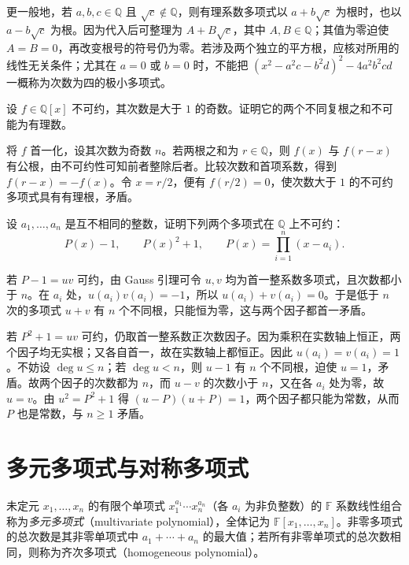 更一般地，若 $a,b,c\in\mathbb Q$ 且 $\sqrt c\notin\mathbb Q$，则有理系数多项式以 $a+b\sqrt c$ 为根时，也以 $a-b\sqrt c$ 为根。因为代入后可整理为 $A+B\sqrt c$，其中 $A,B\in\mathbb Q$；其值为零迫使 $A=B=0$，再改变根号的符号仍为零。若涉及两个独立的平方根，应核对所用的线性无关条件；尤其在 $a=0$ 或 $b=0$ 时，不能把 $(x^2-a^2c-b^2d)^2-4a^2b^2cd$ 一概称为次数为四的极小多项式。

\begin{example}
\label{ex:poly-odd-degree-root-sum}
设 $f\in\mathbb Q[x]$ 不可约，其次数是大于 $1$ 的奇数。证明它的两个不同复根之和不可能为有理数。
\end{example}
\begin{solve}
将 $f$ 首一化，设其次数为奇数 $n$。若两根之和为 $r\in\mathbb Q$，则 $f(x)$ 与 $f(r-x)$ 有公根，由不可约性可知前者整除后者。比较次数和首项系数，得到 $f(r-x)=-f(x)$。令 $x=r/2$，便有 $f(r/2)=0$，使次数大于 $1$ 的不可约多项式具有有理根，矛盾。
\end{solve}

\begin{example}
\label{ex:poly-integer-values-irreducible}
设 $a_1,\ldots,a_n$ 是互不相同的整数，证明下列两个多项式在 $\mathbb Q$ 上不可约：
\[
    P(x)-1,\qquad P(x)^2+1,\qquad P(x)=\prod_{i=1}^n(x-a_i).
\]
\end{example}
\begin{solve}
若 $P-1=uv$ 可约，由 Gauss 引理可令 $u,v$ 均为首一整系数多项式，且次数都小于 $n$。在 $a_i$ 处，$u(a_i)v(a_i)=-1$，所以 $u(a_i)+v(a_i)=0$。于是低于 $n$ 次的多项式 $u+v$ 有 $n$ 个不同根，只能恒为零，这与两个因子都首一矛盾。

若 $P^2+1=uv$ 可约，仍取首一整系数正次数因子。因为乘积在实数轴上恒正，两个因子均无实根；又各自首一，故在实数轴上都恒正。因此 $u(a_i)=v(a_i)=1$。不妨设 $\deg u\leq n$；若 $\deg u<n$，则 $u-1$ 有 $n$ 个不同根，迫使 $u=1$，矛盾。故两个因子的次数都为 $n$，而 $u-v$ 的次数小于 $n$，又在各 $a_i$ 处为零，故 $u=v$。由 $u^2=P^2+1$ 得 $(u-P)(u+P)=1$，两个因子都只能为常数，从而 $P$ 也是常数，与 $n\geq1$ 矛盾。
\end{solve}

\section{多元多项式与对称多项式}
\label{sec:poly-multivariable}

\begin{definition}
未定元 $x_1,\ldots,x_n$ 的有限个单项式 $x_1^{a_1}\cdots x_n^{a_n}$（各 $a_i$ 为非负整数）的 $\mathbb F$ 系数线性组合称为\emph{多元多项式}（multivariate polynomial），全体记为 $\mathbb F[x_1,\ldots,x_n]$。非零多项式的总次数是其非零单项式中 $a_1+\cdots+a_n$ 的最大值；若所有非零单项式的总次数相同，则称为齐次多项式（homogeneous polynomial）。
\end{definition}

